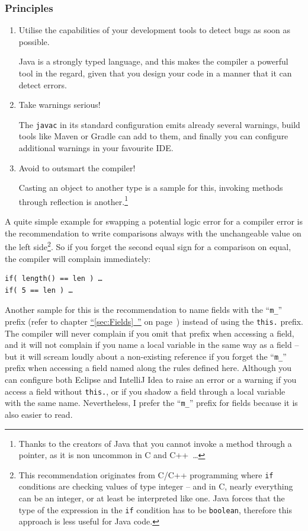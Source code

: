 \documentclass[11pt,a4paper, titlepage, parskip=half, headsepline, footsepline, cleardoublepage=current, headheight=1cm]{scrbook}
\newcommand*{\tqfullvref}[1]{\hyperref[{#1}]{“\ref*{#1}~\nameref*{#1}”} on page~\pageref{#1}}
\begin{document}
\subsubsection{Principles}
\begin{enumerate}[label=P\arabic*.]
\item{Utilise the capabilities of your development tools to detect bugs as soon as possible.

Java is a strongly typed language, and this makes the compiler a powerful tool in the regard, given that you design your code in a manner that it can detect errors.}

\item{Take warnings serious!

The \verb#javac# in its standard configuration emits already several warnings, build tools like Maven\autocite{APACHE_MAVEN} or Gradle\autocite{GRADLE} can add to them, and finally you can configure additional warnings in your favourite IDE.}

\item{Avoid to outsmart the compiler!

Casting an object to another type is a sample for this, invoking methods through reflection is another.\footnote{Thanks to the creators of Java that you cannot invoke a method through a pointer, as it is non uncommon in C and C++~…}}
\end{enumerate}

A quite simple example for swapping a potential logic error for a compiler error is the recommendation to write comparisons always with the unchangeable value on the left side\footnote{This recommendation originates from C/C++ programming where \lstinline|if| conditions are checking values of type integer – and in C, nearly everything can be an integer, or at least be interpreted like one. Java forces that the type of the expression in the \lstinline|if| condition has to be \lstinline|boolean|, therefore this approach is less useful for Java code.}. So if you forget the second equal sign for a comparison on equal, the compiler will complain immediately:
\begin{lstlisting}
if( length() == len ) …
if( 5 == len ) …
\end{lstlisting}

Another sample for this is the recommendation to name fields with the “\verb#m_#” prefix (refer to chapter \tqfullvref{sec:Fields}) instead of using the \lstinline|this.| prefix. The compiler will never complain if you omit that prefix when accessing a field, and it will not complain if you name a local variable in the same way as a field – but it will scream loudly about a non-existing reference if you forget the “\verb#m_#” prefix when accessing a field named along the rules defined here. Although you can configure both Eclipse and IntelliJ Idea to raise an error or a warning if you access a field without \lstinline|this.|, or if you shadow a field through a local variable with the same name. Nevertheless, I prefer the “\verb#m_#” prefix for fields because it is also easier to read.
\end{document}

